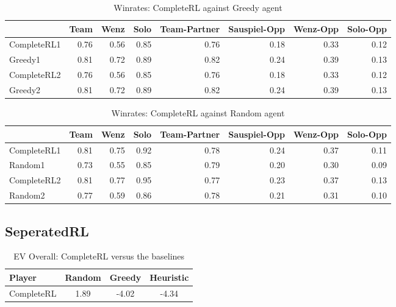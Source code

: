 \begin{table}
    \begin{tabular}{lrrrrrrr}
        \toprule
        {}          & Team & Wenz & Solo & Team-Partner & Sauspiel-Opp & Wenz-Opp & Solo-Opp \\
        \midrule
        CompleteRL1 & 0.76 & 0.56 & 0.85 & 0.76         & 0.18         & 0.33     & 0.12     \\
        Greedy1     & 0.81 & 0.72 & 0.89 & 0.82         & 0.24         & 0.39     & 0.13     \\
        CompleteRL2 & 0.76 & 0.56 & 0.85 & 0.76         & 0.18         & 0.33     & 0.12     \\
        Greedy2     & 0.81 & 0.72 & 0.89 & 0.82         & 0.24         & 0.39     & 0.13     \\
        \bottomrule
    \end{tabular}
    \caption{Winrates: CompleteRL against Greedy agent}
    \label{tab:greedyRL}
\end{table}

\begin{table}
    \begin{tabular}{lrrrrrrr}
        \toprule
        {}          & Team & Wenz & Solo & Team-Partner & Sauspiel-Opp & Wenz-Opp & Solo-Opp \\
        \midrule
        CompleteRL1 & 0.81 & 0.75 & 0.92 & 0.78         & 0.24         & 0.37     & 0.11     \\
        Random1     & 0.73 & 0.55 & 0.85 & 0.79         & 0.20         & 0.30     & 0.09     \\
        CompleteRL2 & 0.81 & 0.77 & 0.95 & 0.77         & 0.23         & 0.37     & 0.13     \\
        Random2     & 0.77 & 0.59 & 0.86 & 0.78         & 0.21         & 0.31     & 0.10     \\
        \bottomrule
    \end{tabular}
    \caption{Winrates: CompleteRL against Random agent}
    \label{tab:rancom}
\end{table}

\subsection{SeperatedRL}
\begin{table}[!h]
    \centering
    \begin{tabular}{lccc}
        \toprule
        Player     & Random & Greedy & Heuristic \\
        \midrule
        CompleteRL & 1.89   & -4.02  & -4.34     \\
        \bottomrule
    \end{tabular}
    \caption{EV Overall: CompleteRL versus the baselines}
    \label{tab:evSeperateRL}
\end{table}

